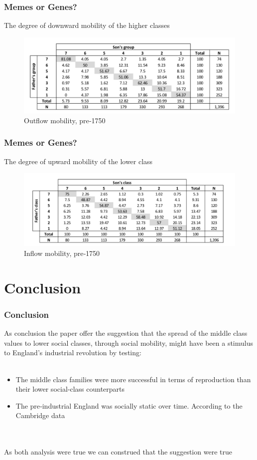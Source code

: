 \documentclass[pdftex,12pt,xcolor=pdftex,table]{beamer}
\begin{document}
\begin{frame}
\frametitle{Memes or Genes?}
The degree of downward mobility of the higher classes 
\begin{figure}[h!]
    \centering
    \includegraphics[width=12cm]{table8.png}
    \caption{Outflow mobility, pre‐1750}
 \end{figure}
\end{frame}
\begin{frame}
\frametitle{Memes or Genes?}
The degree of upward mobility of the lower class
\begin{figure}[h!]
    \centering
    \includegraphics[width=12cm]{table9.png}
    \caption{Inflow mobility, pre‐1750}
 \end{figure}
\end{frame}
\section{Conclusion}
\begin{frame}
\frametitle{Conclusion}    
As conclusion the paper offer the suggestion that the spread of the middle class values to lower social classes, through social mobility, might have been a stimulus to England’s industrial revolution by testing:\\~\\
 \begin{itemize}
    \item The middle class families were more successful in terms of reproduction than their lower social‐class counterparts
    \item The pre‐industrial England was socially static over time. According to the Cambridge data
  \end{itemize}\\~\\
 As both analysis were true we can construed that the suggestion were true

\end{frame}
\end{document}
